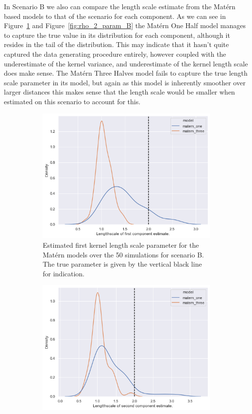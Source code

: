 In Scenario B we also can compare the length scale estimate from the Mat\'ern based models to that of the scenario for each component.
As we can see in Figure~\ref{fig:rho_1_param_B} and Figure~\ref{fig:rho_2_param_B} the Mat\'ern One Half model manages to capture the true value in its distribution for each component, although it resides in the tail of the distribution.
This may indicate that it hasn't quite captured the data generating procedure entirely, however coupled with the underestimate of the kernel variance, and underestimate of the kernel length scale does make sense.
The Mat\'ern Three Halves model fails to capture the true length scale parameter in its model, but again as this model is inherently smoother over larger distances this makes sense that the length scale would be smaller when estimated on this scenario to account for this.
\begin{figure}
	\centering
	\begin{subfigure}[b]{0.45\textwidth}
		\includegraphics[width=\textwidth]{rho_1_param_B}
		\caption{Estimated first kernel length scale parameter for the Mat\'ern models over the 50 simulations for scenario B. The true parameter is given by the vertical black line for indication.}
		\label{fig:rho_1_param_B}
	\end{subfigure}
	\hfill
	\begin{subfigure}[b]{0.45\textwidth}
		\includegraphics[width=\textwidth]{rho_2_param_B}

\end{subfigure}
\end{figure}
